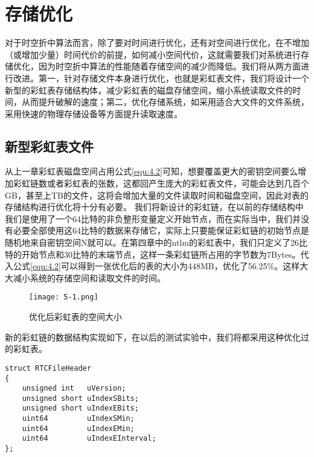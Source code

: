 \section{存储优化}
对于时空折中算法而言，除了要对时间进行优化，还有对空间进行优化，在不增加（或增加少量）时间代价的前提，如何减小空间代价，这就需要我们对系统进行存储优化，因为时空折中算法的性能随着存储空间的减少而降低。我们将从两方面进行改进。第一，针对存储文件本身进行优化，也就是彩虹表文件，我们将设计一个新型的彩虹表存储结构体，减少彩虹表的磁盘存储空间，缩小系统读取文件的时间，从而提升破解的速度；第二，优化存储系统，如采用适合大文件的文件系统，采用快速的物理存储设备等方面提升读取速度。
\subsection{新型彩虹表文件}
从上一章彩虹表磁盘空间占用公式\eqref{equ:4.2}可知，想要覆盖更大的密钥空间要么增加彩虹链数或者彩虹表的张数，这都回产生庞大的彩虹表文件，可能会达到几百个GB，甚至上TB的文件，这将会增加大量的文件读取时间和磁盘空间，因此对表的存储结构进行优化将十分有必要。
我们将新设计的彩虹链，在以前的存储结构中我们是使用了一个64比特的非负整形变量定义开始节点，而在实际当中，我们并没有必要全部使用这64比特的数据来存储它，实际上只要能保证彩虹链的初始节点是随机地来自密钥空间N就可以。在第四章中的ntlm的彩虹表中，我们只定义了26比特的开始节点和30比特的末端节点，这样一条彩虹链所占用的字节数为7Bytes。代入公式\eqref{equ:4.2}可以得到一张优化后的表的大小为448MB，优化了56.25\%。这样大大减小系统的存储空间和读取文件的时间。
\begin{figure}[!ht]
\centering
\texttt{[image: 5-1.png]}
\caption{优化后彩虹表的空间大小}
\label{fig:5.1}
\end{figure}

新的彩虹链的数据结构实现如下，在以后的测试实验中，我们将都采用这种优化过的彩虹表。
\begin{lstlisting}
struct RTCFileHeader
{
    unsigned int   uVersion;    
    unsigned short uIndexSBits; 
    unsigned short uIndexEBits; 
    uint64         uIndexSMin;
    uint64         uIndexEMin;
    uint64         uIndexEInterval;
};
\end{lstlisting}
